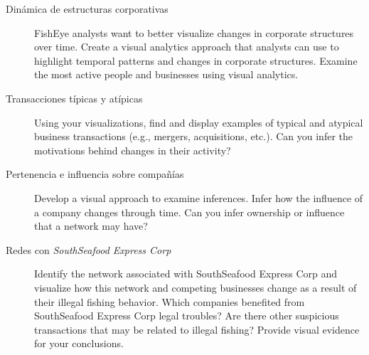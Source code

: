 \documentclass[11pt,spanish,a4paper]{article}
\begin{document}
\begin{description}
	\item[Dinámica de estructuras corporativas]
    FishEye analysts want to better visualize changes in corporate structures over time. Create a visual analytics approach that analysts can use to highlight temporal patterns and changes in corporate structures. Examine the most active people and businesses using visual analytics.
	\item[Transacciones típicas y atípicas]
    Using your visualizations, find and display examples of typical and atypical business transactions (e.g., mergers, acquisitions, etc.). Can you infer the motivations behind changes in their activity?
	\item[Pertenencia e influencia sobre compañías]
		Develop a visual approach to examine inferences. Infer how the influence of a company changes through time. Can you infer ownership or influence that a network may have?
	\item[Redes con \emph{SouthSeafood Express Corp}]
    Identify the network associated with SouthSeafood Express Corp and visualize how this network and competing businesses change as a result of their illegal fishing behavior. Which companies benefited from SouthSeafood Express Corp legal troubles? Are there other suspicious transactions that may be related to illegal fishing? Provide visual evidence for your conclusions.
\end{description}
\end{document}
